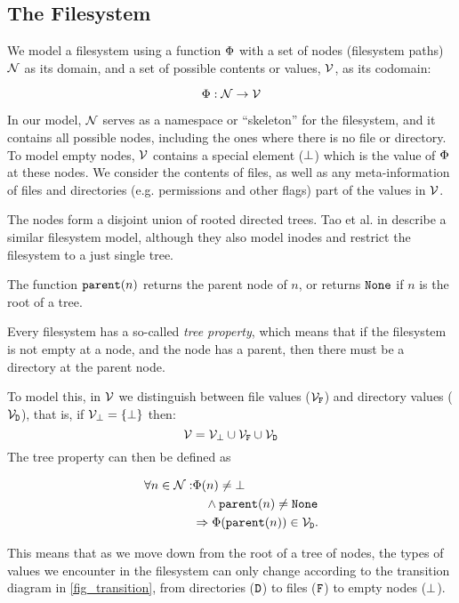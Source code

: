
\subsection{The Filesystem}

We model a filesystem using a function $\Phi$ with a set of nodes (filesystem paths) $\mathcal{N}$ as its domain,
and a set of possible contents or values, $\mathcal{V}$, as its codomain:
\begin{mydef}[Filesystem]
\[ \Phi : \mathcal{N} \rightarrow \mathcal{V} \] 
\end{mydef}
In our model, $\mathcal{N}$ 
serves as a namespace or ``skeleton'' for the filesystem, and it
contains all possible nodes, including the ones where there is no file or directory.
To model empty nodes, $\mathcal{V}$ 
contains a special element ($\bot$) which is the value of $\Phi$ at these nodes.
We consider the contents of files, as well as any meta-information of files
and directories (e.g. permissions and other flags) part of the values in $\mathcal{V}$.

The nodes form a disjoint union of rooted directed trees.
Tao et al. in \cite{TSR} describe a similar filesystem model, although
they also model inodes and restrict the filesystem to a just single tree.
\begin{mydef}[$\parent$]
The function $\mathtt{parent}(n)$ returns the parent node of $n$, or
returns $\mathtt{None}$ if $n$ is the root of a tree.
\end{mydef}

Every filesystem has a so-called \emph{tree property}, which means that
if the filesystem is not empty at a node, and the node has a parent,
then there must be a directory at the parent node.

To model this, in $\mathcal{V}$ we distinguish between 
file values ($\mathcal{V}_{\mathtt{F}}$) and directory values ($\mathcal{V}_{\mathtt{D}}$), that is,
if $\mathcal{V}_{\bot} = \{\bot\}$ then:
\[ \mathcal{V} = \mathcal{V}_{\bot} \cup \mathcal{V}_{\mathtt{F}} \cup \mathcal{V}_{\mathtt{D}} \]
The tree property can then be defined as
\begin{mydef}
\begin{align*}
\forall n\in\setn: &\FS(n) \neq \empt \\ %
&\quad\wedge \parent(n) \neq \topnode \\
&\Rightarrow \FS(\parent(n)) \in \setd. 
\end{align*}
\end{mydef}
This means that as we move down from the root of a tree of nodes,
the types of values we encounter in the filesystem can only change according to the
transition diagram in \cref{fig_transition}, from directories ($\mathtt{D}$) to files ($\mathtt{F}$)
to empty nodes ($\bot$).

